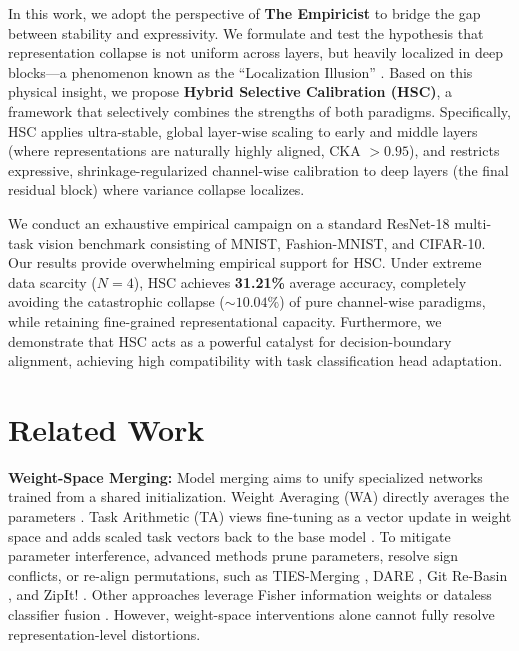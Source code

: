 \documentclass{article}
\begin{document}
In this work, we adopt the perspective of \textbf{The Empiricist} to bridge the gap between stability and expressivity. We formulate and test the hypothesis that representation collapse is not uniform across layers, but heavily localized in deep blocks—a phenomenon known as the ``Localization Illusion'' \cite{anonymous2026deconstructing}. Based on this physical insight, we propose \textbf{Hybrid Selective Calibration (HSC)}, a framework that selectively combines the strengths of both paradigms. Specifically, HSC applies ultra-stable, global layer-wise scaling to early and middle layers (where representations are naturally highly aligned, CKA $>0.95$), and restricts expressive, shrinkage-regularized channel-wise calibration to deep layers (the final residual block) where variance collapse localizes.

We conduct an exhaustive empirical campaign on a standard ResNet-18 multi-task vision benchmark consisting of MNIST, Fashion-MNIST, and CIFAR-10. Our results provide overwhelming empirical support for HSC. Under extreme data scarcity ($N=4$), HSC achieves \textbf{31.21\%} average accuracy, completely avoiding the catastrophic collapse ($\sim 10.04\%$) of pure channel-wise paradigms, while retaining fine-grained representational capacity. Furthermore, we demonstrate that HSC acts as a powerful catalyst for decision-boundary alignment, achieving high compatibility with task classification head adaptation.

\section{Related Work}
\label{sec:related}

\textbf{Weight-Space Merging:} Model merging aims to unify specialized networks trained from a shared initialization. Weight Averaging (WA) directly averages the parameters \cite{izmailov2018averaging}. Task Arithmetic (TA) views fine-tuning as a vector update in weight space and adds scaled task vectors back to the base model \cite{ilharco2022editing}. To mitigate parameter interference, advanced methods prune parameters, resolve sign conflicts, or re-align permutations, such as TIES-Merging \cite{yadav2023ties}, DARE \cite{yu2024dare}, Git Re-Basin \cite{ainsworth2023git}, and ZipIt! \cite{stoica2024zipit}. Other approaches leverage Fisher information weights \cite{matena2021merging} or dataless classifier fusion \cite{jin2020dataless}. However, weight-space interventions alone cannot fully resolve representation-level distortions.
\end{document}
